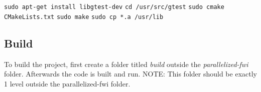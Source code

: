 \documentclass[10pt]{article}
\begin{document}
\texttt{sudo apt-get install libgtest-dev}
\newline
\texttt{cd /usr/src/gtest}
\newline
\texttt{sudo cmake CMakeLists.txt}
\newline
\texttt{sudo make}
\newline
\texttt{sudo cp *.a /usr/lib}


\subsection{Build}\label{subsec:BuildSection}
To build the project, first create a folder titled \textit{build} outside the \textit{parallelized-fwi} folder. Afterwards the code is built and run. 
NOTE: This folder should be exactly 1 level outside the parallelized-fwi folder.
\newline
\end{document}
